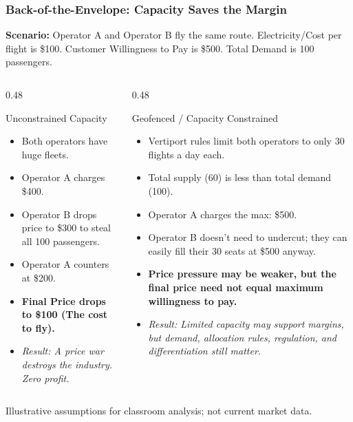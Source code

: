 \documentclass{beamer}
\begin{document}
\begin{frame}[t, shrink=10]
  \frametitle{Back-of-the-Envelope: Capacity Saves the Margin}
  
  \textbf{Scenario:} Operator A and Operator B fly the same route. Electricity/Cost per flight is \$100. Customer Willingness to Pay is \$500. Total Demand is 100 passengers.

  \vspace{0.3cm}
  \begin{columns}[T]
    \begin{column}{0.48\textwidth}
      \begin{block}{Unconstrained Capacity}
      \begin{itemize}
          \item Both operators have huge fleets.
          \item Operator A charges \$400.
          \item Operator B drops price to \$300 to steal all 100 passengers.
          \item Operator A counters at \$200.
          \item \textbf{Final Price drops to \$100 (The cost to fly).}
          \item \textit{Result: A price war destroys the industry. Zero profit.}
      \end{itemize}
      \end{block}
    \end{column}

    \begin{column}{0.48\textwidth}
      \begin{block}{Geofenced / Capacity Constrained}
      \begin{itemize}
          \item Vertiport rules limit both operators to only 30 flights a day each.
          \item Total supply (60) is less than total demand (100).
          \item Operator A charges the max: \$500.
          \item Operator B doesn't need to undercut; they can easily fill their 30 seats at \$500 anyway.
          \item \textbf{Price pressure may be weaker, but the final price need not equal maximum willingness to pay.}
          \item \textit{Result: Limited capacity may support margins, but demand, allocation rules, regulation, and differentiation still matter.}
      \end{itemize}
      \end{block}
    \end{column}
  \end{columns}

\vfill
{\tiny Illustrative assumptions for classroom analysis; not current market data.}
\end{frame}
\end{document}
